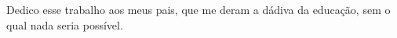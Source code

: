 
\begin{dedicatoria}%
Dedico esse trabalho aos meus pais, que me deram a dádiva da educação, sem o
qual nada seria possível.
\end{dedicatoria}
